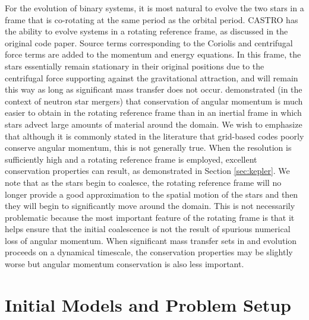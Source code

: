 \documentclass[12pt,preprint]{aastex}
\begin{document}
For the evolution of binary systems, it is most natural to evolve the two stars in a frame that is co-rotating at the same period as the orbital period. CASTRO has the ability to evolve systems in a rotating reference frame, as discussed in the original code paper. Source terms corresponding to the Coriolis and centrifugal force terms are added to the momentum and energy equations. In this frame, the stars essentially remain stationary in their original positions due to the centrifugal force supporting against the gravitational attraction, and will remain this way as long as significant mass transfer does not occur. \cite{swc:2000} demonstrated (in the context of neutron star mergers) that conservation of angular momentum is much easier to obtain in the rotating reference frame than in an inertial frame in which stars advect large amounts of material around the domain. We wish to emphasize that although it is commonly stated in the literature that grid-based codes poorly conserve angular momentum, this is not generally true. When the resolution is sufficiently high and a rotating reference frame is employed, excellent conservation properties can result, as demonstrated in Section \ref{sec:kepler}. We note that as the stars begin to coalesce, the rotating reference frame will no longer provide a good approximation to the spatial motion of the stars and then they will begin to significantly move around the domain. This is not necessarily problematic because the most important feature of the rotating frame is that it helps ensure that the initial coalescence is not the result of spurious numerical loss of angular momentum. When significant mass transfer sets in and evolution proceeds on a dynamical timescale, the conservation properties may be slightly worse but angular momentum conservation is also less important.


\section{Initial Models and Problem Setup}
\label{sec:initial_models}
\end{document}

